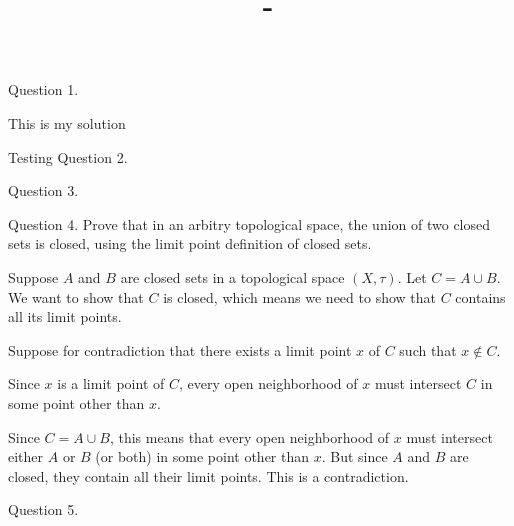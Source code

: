\documentclass[answers,12pt,addpoints]{exam}
\author{\name}
\title{\course \ - \assignment}
\begin{document}
\maketitle

\newpage
\begin{questions}
\question Question 1.
\begin{solution}
This is my solution
\end{solution}
Testing
\question Question 2.
\begin{solution}
    
\end{solution}
\question Question 3.
\begin{solution}
    
\end{solution}

\question Question 4.
Prove that in an arbitry topological space, the union of two closed sets is closed, using the limit point definition of closed sets.
\begin{solution}
    Suppose $A$ and $B$ are closed sets in a topological space $(X, \tau)$. 
    Let $C = A \cup B$. We want to show that $C$ is closed, which means we need to show that $C$ contains all its limit points.
    
    Suppose for contradiction that there exists a limit point $x$ of $C$ such that $x \notin C$. 
    
    Since $x$ is a limit point of $C$, every open neighborhood of $x$ must intersect $C$ in some point other than $x$. 
    
    Since $C = A \cup B$, this means that every open neighborhood of $x$ must intersect either $A$ or $B$ (or both) in some point other than $x$. But since $A$ and $B$ are closed, they contain all their limit points. This is a contradiction.
\end{solution}

\question Question 5.

\begin{solution}
    
\end{solution}

\end{questions}
\end{document}
